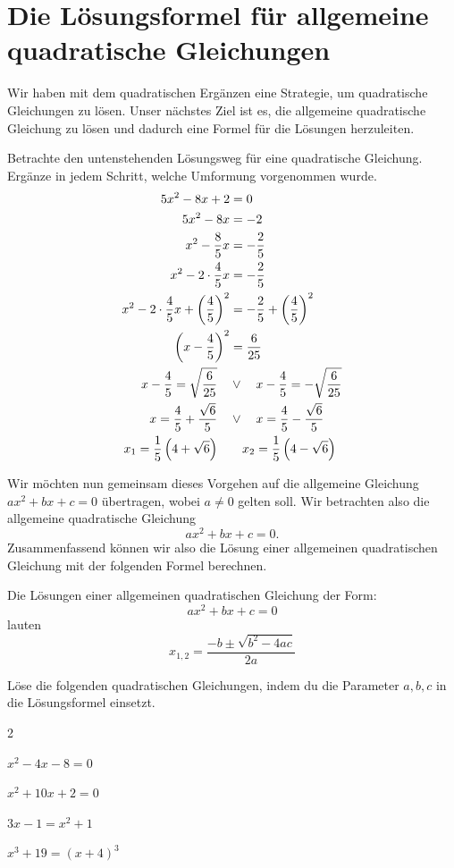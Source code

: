 \documentclass[11pt,oneside]{article}
\begin{document}
\section{Die Lösungsformel für allgemeine quadratische Gleichungen}
	Wir haben mit dem quadratischen Ergänzen eine Strategie, um quadratische Gleichungen zu lösen. Unser nächstes Ziel ist es, die allgemeine quadratische Gleichung zu lösen und dadurch eine Formel für die Lösungen herzuleiten.
	\begin{aufgabe}
		Betrachte den untenstehenden Lösungsweg für eine quadratische Gleichung. Ergänze in jedem Schritt, welche Umformung vorgenommen wurde.
		\begin{align*}
			5x^2-8x+2&=0\\
			5x^2-8x&=-2\\
			x^2-\frac{8}{5}x&=-\frac{2}{5}\\
			x^2-2\cdot\frac{4}{5}x&=-\frac{2}{5}\\
			x^2-2\cdot\frac{4}{5}x+\left(\frac{4}{5}\right)^2&=-\frac{2}{5}+\left(\frac{4}{5}\right)^2\\
			\left(x-\frac{4}{5}\right)^2&=\frac{6}{25}\\
			x-\frac{4}{5}=\sqrt{\frac{6}{25}}\quad&\vee\quad x-\frac{4}{5}=-\sqrt{\frac{6}{25}}\\
			x=\frac{4}{5}+\frac{\sqrt{6}}{5}\quad&\vee\quad x=\frac{4}{5}-\frac{\sqrt{6}}{5}\\
			x_1=\frac{1}{5}\left(4+\sqrt{6}\right)\quad&\quad x_2=\frac{1}{5}\left(4-\sqrt{6}\right)
		\end{align*}
	\end{aufgabe}
	Wir möchten nun gemeinsam dieses Vorgehen auf die allgemeine Gleichung $ax^2+bx+c=0$ übertragen, wobei $a\neq0$ gelten soll. Wir betrachten also die allgemeine quadratische Gleichung
	\[ax^2+bx+c=0.\]
	\newpage
	Zusammenfassend können wir also die Lösung einer allgemeinen quadratischen Gleichung mit der folgenden Formel berechnen.
	\begin{satz}
		Die Lösungen einer allgemeinen quadratischen Gleichung der Form:
		\[ax^2+bx+c=0\]
		lauten
		\begin{equation}\label{satz:mitternacht}
			x_{1,2}=\frac{-b\pm\sqrt{b^2-4ac}}{2a}
		\end{equation}
	\end{satz}
	\begin{aufgabe}
		Löse die folgenden quadratischen Gleichungen, indem du die Parameter $a,b,c$ in die Lösungsformel einsetzt.
		\begin{enumerate}[label=\alph*)]\end{enumerate}
	\end{aufgabe}
\end{document}
